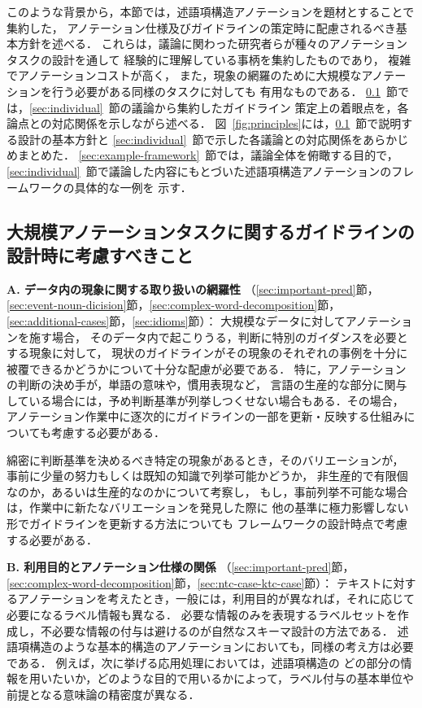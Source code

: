 \documentclass[japanese]{jnlp_1.4}
\begin{document}
このような背景から，本節では，述語項構造アノテーションを題材とすることで集約した，
アノテーション仕様及びガイドラインの策定時に配慮されるべき基本方針を述べる．
これらは，議論に関わった研究者らが種々のアノテーションタスクの設計を通して
経験的に理解している事柄を集約したものであり，
複雑でアノテーションコストが高く，
また，現象の網羅のために大規模なアノテーションを行う必要がある同様のタスクに対しても
有用なものである．
\ref{sec:criteria}~節では，\ref{sec:individual}~節の議論から集約したガイドライン
策定上の着眼点を，各論点との対応関係を示しながら述べる．
図~\ref{fig:principles}には，\ref{sec:criteria}~節で説明する設計の基本方針と
\ref{sec:individual}~節で示した各議論との対応関係をあらかじめまとめた．
\ref{sec:example-framework}~節では，議論全体を俯瞰する目的で，
\ref{sec:individual}~節で議論した内容にもとづいた述語項構造アノテーションのフレームワークの具体的な一例を
示す．


\subsection{大規模アノテーションタスクに関するガイドラインの設計時に考慮すべきこと}
\label{sec:criteria}


\noindent
\textbf{A. データ内の現象に関する取り扱いの網羅性}
（\ref{sec:important-pred}節，\ref{sec:event-noun-dicision}節，\ref{sec:complex-word-decomposition}節，
\ref{sec:additional-cases}節，\ref{sec:idioms}節）：
大規模なデータに対してアノテーションを施す場合，
そのデータ内で起こりうる，判断に特別のガイダンスを必要とする現象に対して，
現状のガイドラインがその現象のそれぞれの事例を十分に被覆できるかどうかについて十分な配慮が必要である．
特に，アノテーションの判断の決め手が，単語の意味や，慣用表現など，
言語の生産的な部分に関与している場合には，予め判断基準が列挙しつくせない場合もある．その場合，
アノテーション作業中に逐次的にガイドラインの一部を更新・反映する仕組みについても考慮する必要がある．

綿密に判断基準を決めるべき特定の現象があるとき，そのバリエーションが，
事前に少量の努力もしくは既知の知識で列挙可能かどうか，
非生産的で有限個なのか，あるいは生産的なのかについて考察し，
もし，事前列挙不可能な場合は，作業中に新たなバリエーションを発見した際に
他の基準に極力影響しない形でガイドラインを更新する方法についても
フレームワークの設計時点で考慮する必要がある．


\noindent
\textbf{B. 利用目的とアノテーション仕様の関係}
（\ref{sec:important-pred}節，\ref{sec:complex-word-decomposition}節，\ref{sec:ntc-case-ktc-case}節）：
テキストに対するアノテーションを考えたとき，一般には，利用目的が異なれば，それに応じて必要になるラベル情報も異なる．
必要な情報のみを表現するラベルセットを作成し，不必要な情報の付与は避けるのが自然なスキーマ設計の方法である．
述語項構造のような基本的構造のアノテーションにおいても，同様の考え方は必要である．
例えば，次に挙げる応用処理においては，述語項構造の
どの部分の情報を用いたいか，どのような目的で用いるかによって，ラベル付与の基本単位や
前提となる意味論の精密度が異なる．
\end{document}
